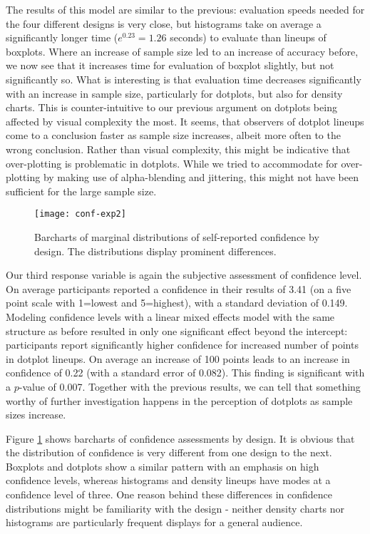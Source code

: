 The results of this model are similar to the previous: evaluation speeds needed for the four different designs is very close, but  histograms take on average a significantly longer time ($e^{0.23} = 1.26$ seconds) to evaluate than lineups of boxplots. 
Where an increase of sample size led to an increase of accuracy before, we now see that it increases time for evaluation of boxplot slightly, but not significantly so. What is interesting is that evaluation time decreases significantly with an increase in sample size, particularly for dotplots, but also for density charts. This is counter-intuitive to our previous argument on dotplots being affected by visual complexity the most. It seems, that observers of dotplot lineups come to a conclusion faster as sample size increases, albeit more often to  the wrong conclusion. Rather than visual complexity, this might be indicative that over-plotting is problematic in dotplots. While we tried to accommodate for over-plotting by making use of alpha-blending and jittering, this might not have been sufficient for the large sample size.
 
\begin{figure}[htbp] %
   \centering
   \texttt{[image: conf-exp2]} 
   \caption{Barcharts of marginal distributions of self-reported confidence by design. The distributions display prominent differences.}
   \label{fig:conf-margins}
\end{figure}

Our third response variable is again the subjective assessment of confidence level. On average participants reported a confidence in their results of  3.41 (on a five point scale with 1=lowest and 5=highest), with a standard deviation of 0.149. Modeling confidence levels with a linear mixed effects model with the same structure as before resulted in only one significant effect beyond the intercept: participants report significantly higher confidence for increased number of  points in dotplot lineups. On average an increase of 100 points leads to an increase in confidence of 0.22 (with a standard error of 0.082). This finding is significant with a $p$-value of 0.007. 
Together with the previous results, we can tell that something worthy of further investigation happens in the perception of dotplots as sample sizes increase. 



Figure \ref{fig:conf-margins} shows barcharts of confidence assessments by design. It is obvious that the distribution of confidence is very different from one design to the next. Boxplots and dotplots show a similar pattern with an emphasis on high confidence levels, whereas histograms and density lineups have modes at a confidence level of three. 
One reason behind these differences in confidence distributions might be familiarity with the design - neither density charts nor histograms are particularly frequent displays for a general audience. 




